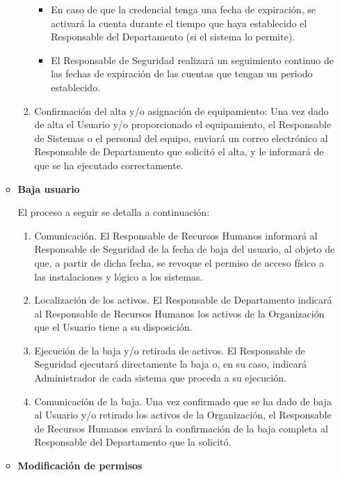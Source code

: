 \begin{enumerate}[label=\alph*)]
\begin{itemize}
\begin{enumerate}[label=\arabic*.]
            \begin{itemize}
                \item En caso de que la credencial tenga una fecha de expiración, se activará la cuenta durante el tiempo que haya establecido el Responsable del Departamento (si el sistema lo permite).
                \item El Responsable de Seguridad realizará un seguimiento continuo de las fechas de expiración de las cuentas que tengan un periodo establecido.
            \end{itemize}
            \item Confirmación del alta y/o asignación de equipamiento: Una vez dado de alta el Usuario y/o proporcionado el equipamiento, el Responsable de Sistemas o el personal del equipo, enviará un correo electrónico al Responsable de Departamento que solicitó el alta, y le informará de que se ha ejecutado correctamente.
        \end{enumerate}

        \item \textbf{Baja usuario}

        El proceso a seguir se detalla a continuación:

        \begin{enumerate}[label=\arabic*.]
            \item Comunicación. El Responsable de Recursos Humanos informará al Responsable de Seguridad de la fecha de baja del usuario, al objeto de que, a partir de dicha fecha, se revoque el permiso de acceso físico a las instalaciones y lógico a los sistemas.
            \item Localización de los activos. El Responsable de Departamento indicará al Responsable de Recursos Humanos los activos de la Organización que el Usuario tiene a su disposición.
            \item Ejecución de la baja y/o retirada de activos. El Responsable de Seguridad ejecutará directamente la baja o, en su caso, indicará Administrador de cada sistema que proceda a su ejecución.
            \item Comunicación de la baja. Una vez confirmado que se ha dado de baja al Usuario y/o retirado los activos de la Organización, el Responsable de Recursos Humanos enviará la confirmación de la baja completa al Responsable del Departamento que la solicitó.
        \end{enumerate}

        \item \textbf{Modificación de permisos}


\end{itemize}
\end{enumerate}
